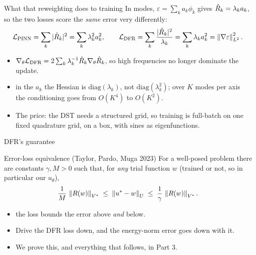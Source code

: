 \documentclass[11pt,aspectratio=169]{beamer}
\begin{document}
\begin{frame}{What that reweighting does to training}
  In modes, $\varepsilon = \sum_k a_k \phi_k$ gives $\hat{R}_k = \lambda_k a_k$,
  so the two losses score the \emph{same} error very differently:
  \[
    \mathcal{L}_{\text{PINN}} = \sum_k |\hat{R}_k|^2 = \sum_k \lambda_k^2 a_k^2,
    \qquad
    \mathcal{L}_{\text{DFR}} = \sum_k \frac{|\hat{R}_k|^2}{\lambda_k}
      = \sum_k \lambda_k a_k^2 = \left\|\nabla \varepsilon\right\|_{L^2}^2 .
  \]
  \begin{itemize}\itemsep0.4em
    \item {}
          $\nabla_\theta \mathcal{L}_{\text{DFR}}
           = 2\sum_k \lambda_k^{-1} \hat{R}_k \nabla_\theta \hat{R}_k$,
          so high frequencies no longer dominate the update.
    \item {} in the $a_k$ the Hessian is
          $\mathrm{diag}(\lambda_k)$, not $\mathrm{diag}(\lambda_k^2)$; over $K$
          modes per axis the conditioning goes from $O(K^4)$ to $O(K^2)$.
    \item \alert{The price:} the DST needs a structured grid, so training is
          full-batch on one fixed quadrature grid, on a box, with sines as
          eigenfunctions.
  \end{itemize}
\end{frame}

\begin{frame}{DFR's guarantee}
  \begin{block}{Error-loss equivalence (Taylor, Pardo, Muga 2023)}
    For a well-posed problem there are constants $\gamma, M > 0$ such that, for
    \emph{any} trial function $w$ (trained or not, so in particular our
    $u_\theta$),
    \[
      \frac{1}{M}\,\left\|R(w)\right\|_{V^*}
        \;\le\; \left\|u^* - w\right\|_U
        \;\le\; \frac{1}{\gamma}\,\left\|R(w)\right\|_{V^*} .
    \]
  \end{block}
  \medskip
  \begin{itemize}\itemsep0.5em
    \item {} the loss bounds the error above \emph{and} below.
    \item Drive the DFR loss down, and the energy-norm error goes down with it.
    \item We prove this, and everything that follows, in Part 3.
  \end{itemize}
\end{frame}
\end{document}
